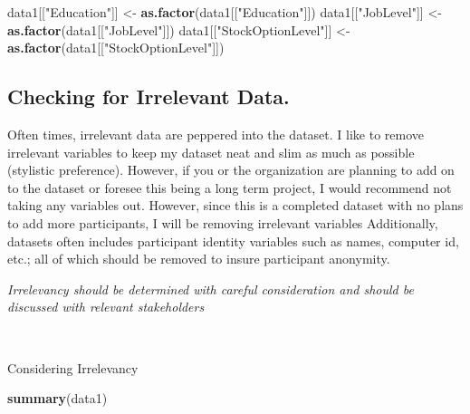 \documentclass[
]{article}
\newenvironment{Shaded}{\begin{snugshade}}{\end{snugshade}}
\newcommand{\KeywordTok}[1]{\textcolor[rgb]{0.13,0.29,0.53}{\textbf{#1}}}
\newcommand{\NormalTok}[1]{#1}
\newcommand{\StringTok}[1]{\textcolor[rgb]{0.31,0.60,0.02}{#1}}
\begin{document}
\begin{Shaded}
\begin{Highlighting}[]
\NormalTok{data1[[}\StringTok{"Education"}\NormalTok{]] <-}\StringTok{ }\KeywordTok{as.factor}\NormalTok{(data1[[}\StringTok{"Education"}\NormalTok{]])}
\NormalTok{data1[[}\StringTok{"JobLevel"}\NormalTok{]] <-}\StringTok{ }\KeywordTok{as.factor}\NormalTok{(data1[[}\StringTok{"JobLevel"}\NormalTok{]])}
\NormalTok{data1[[}\StringTok{"StockOptionLevel"}\NormalTok{]] <-}\StringTok{ }\KeywordTok{as.factor}\NormalTok{(data1[[}\StringTok{"StockOptionLevel"}\NormalTok{]])}
\end{Highlighting}
\end{Shaded}

\hypertarget{checking-for-irrelevant-data.}{%
\subsection{Checking for Irrelevant
Data.}\label{checking-for-irrelevant-data.}}

Often times, irrelevant data are peppered into the dataset. I like to
remove irrelevant variables to keep my dataset neat and slim as much as
possible (stylistic preference). However, if you or the organization are
planning to add on to the dataset or foresee this being a long term
project, I would recommend not taking any variables out. However, since
this is a completed dataset with no plans to add more participants, I
will be removing irrelevant variables Additionally, datasets often
includes participant identity variables such as names, computer id,
etc.; all of which should be removed to insure participant anonymity.

\emph{Irrelevancy should be determined with careful consideration and
should be discussed with relevant stakeholders}

~ ~

Considering Irrelevancy

\begin{Shaded}
\begin{Highlighting}[]
\KeywordTok{summary}\NormalTok{(data1)}
\end{Highlighting}
\end{Shaded}
\end{document}
